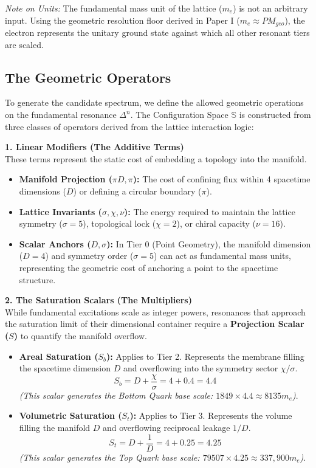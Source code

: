 \textit{Note on Units:} The fundamental mass unit of the lattice ($m_e$) is not an arbitrary input. Using the geometric resolution floor derived in Paper I ($m_e \approx PM_{geo}$), the electron represents the unitary ground state against which all other resonant tiers are scaled.

\subsection*{The Geometric Operators}

To generate the candidate spectrum, we define the allowed geometric operations on the fundamental resonance $\Delta^n$. The Configuration Space $\mathbb{S}$ is constructed from three classes of operators derived from the lattice interaction logic:

\textbf{1. Linear Modifiers (The Additive Terms)} \\
These terms represent the static cost of embedding a topology into the manifold.
\begin{itemize}
    \item \textbf{Manifold Projection ($\pi D, \pi$):} The cost of confining flux within 4 spacetime dimensions ($D$) or defining a circular boundary ($\pi$).
    \item \textbf{Lattice Invariants ($\sigma, \chi, \nu$):} The energy required to maintain the lattice symmetry ($\sigma=5$), topological lock ($\chi=2$), or chiral capacity ($\nu=16$).
    \item \textbf{Scalar Anchors ($D, \sigma$):} In Tier 0 (Point Geometry), the manifold dimension ($D=4$) and symmetry order ($\sigma=5$) can act as fundamental mass units, representing the geometric cost of anchoring a point to the spacetime structure.
\end{itemize}

\textbf{2. The Saturation Scalars (The Multipliers)} \\
While fundamental excitations scale as integer powers, resonances that approach the saturation limit of their dimensional container require a \textbf{Projection Scalar ($S$)} to quantify the manifold overflow.
\begin{itemize}
    \item \textbf{Areal Saturation ($S_b$):} Applies to Tier 2. Represents the membrane filling the spacetime dimension $D$ and overflowing into the symmetry sector $\chi/\sigma$.
    \[ S_b = D + \frac{\chi}{\sigma} = 4 + 0.4 = \mathbf{4.4} \]
    \textit{(This scalar generates the Bottom Quark base scale: $1849 \times 4.4 \approx 8135 m_e$)}.
    \item \textbf{Volumetric Saturation ($S_t$):} Applies to Tier 3. Represents the volume filling the manifold $D$ and overflowing reciprocal leakage $1/D$.
    \[ S_t = D + \frac{1}{D} = 4 + 0.25 = \mathbf{4.25} \]
    \textit{(This scalar generates the Top Quark base scale: $79507 \times 4.25 \approx 337,900 m_e$)}.
\end{itemize}

